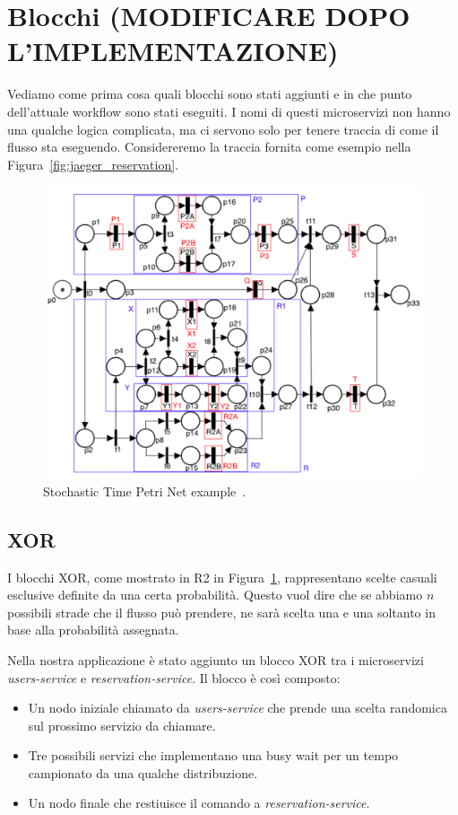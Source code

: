 \section{Blocchi (MODIFICARE DOPO L'IMPLEMENTAZIONE)}
\label{sec:blocchi}
Vediamo come prima cosa quali blocchi sono stati aggiunti e in che punto dell'attuale workflow sono stati eseguiti. I nomi di questi microservizi non hanno una qualche logica complicata, ma ci servono solo per tenere traccia di come il flusso sta eseguendo. Considereremo la traccia fornita come esempio nella Figura~\ref{fig:jaeger_reservation}.
\begin{figure}[htbp]
    \centering
    \includegraphics[width=.8\textwidth]{images/5-workflow/STPN.pdf}
    \caption{Stochastic Time Petri Net example~\cite{carnevali2023compositional}.}
    \label{fig:STPN}
\end{figure}

\subsection{XOR}
I blocchi XOR, come mostrato in R2 in Figura~\ref{fig:STPN}, rappresentano scelte casuali esclusive definite da una certa probabilità. Questo vuol dire che se abbiamo $n$ possibili strade che il flusso può prendere, ne sarà scelta una e una soltanto in base alla probabilità assegnata.

Nella nostra applicazione è stato aggiunto un blocco XOR tra i microservizi \textit{users-service} e \textit{reservation-service}. Il blocco è così composto:
\begin{itemize}
    \item Un nodo iniziale chiamato da \textit{users-service} che prende una scelta randomica sul prossimo servizio da chiamare.
    \item Tre possibili servizi che implementano una busy wait per un tempo campionato da una qualche distribuzione.
    \item Un nodo finale che restiuisce il comando a \textit{reservation-service}.
\end{itemize}

